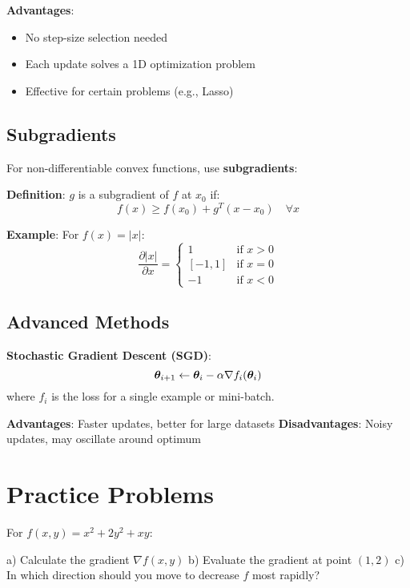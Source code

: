 \documentclass{article}
\newcounter{exercise}
\begin{document}
\textbf{Advantages}:
\begin{itemize}
    \item No step-size selection needed
    \item Each update solves a 1D optimization problem
    \item Effective for certain problems (e.g., Lasso)
\end{itemize}

\subsection{Subgradients}

For non-differentiable convex functions, use \textbf{subgradients}:

\textbf{Definition}: $g$ is a subgradient of $f$ at $x_0$ if:
$$f(x) \geq f(x_0) + g^T(x - x_0) \quad \forall x$$

\textbf{Example}: For $f(x) = |x|$:
$$\frac{\partial |x|}{\partial x} = \begin{cases}
1 & \text{if } x > 0 \\
[-1, 1] & \text{if } x = 0 \\
-1 & \text{if } x < 0
\end{cases}$$

\subsection{Advanced Methods}

\textbf{Stochastic Gradient Descent (SGD)}:
$$\boldsymbol{\theta}_{i+1} \leftarrow \boldsymbol{\theta}_i - \alpha \nabla f_i(\boldsymbol{\theta}_i)$$
where $f_i$ is the loss for a single example or mini-batch.

\textbf{Advantages}: Faster updates, better for large datasets
\textbf{Disadvantages}: Noisy updates, may oscillate around optimum

\section{Practice Problems}

\begin{tcolorbox}[colback=gray!5!white,colframe=gray!75!black,title=Problem \stepcounter{exercise}: Basic Gradient Calculation]

For $f(x, y) = x^2 + 2y^2 + xy$:

a) Calculate the gradient $\nabla f(x, y)$
b) Evaluate the gradient at point $(1, 2)$
c) In which direction should you move to decrease $f$ most rapidly?
\end{tcolorbox}
\end{document}
